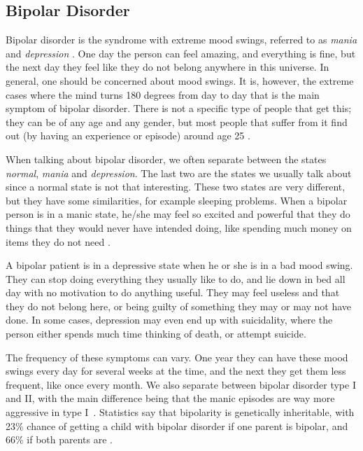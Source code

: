 \subsection{Bipolar Disorder}

Bipolar disorder is the syndrome with extreme mood swings, referred to as \emph{mania} and \emph{depression} \cite{bipolar_disorder}. One day the person can feel amazing, and everything is fine, 
but the next day they feel like they do not belong anywhere in this universe. In general, one should be concerned about mood swings. 
It is, however, the extreme cases where the mind turns 180 degrees from day to day that is the main symptom of bipolar disorder. 
There is not a specific type of people that get this; they can be of any age and any gender, but most people that suffer from it find out 
(by having an experience or episode) around age 25 \cite{bipolar_statistics}. 

When talking about bipolar disorder, we often separate between the states \emph{normal}, \emph{mania} and \emph{depression}. 
The last two are the states we usually talk about since a normal state is not that interesting. These two states are very different, 
but they have some similarities, for example sleeping problems. When a bipolar person is in a manic state, he/she may feel so excited and powerful that they do things that they would never have intended doing, like spending much money on items they do 
not need \cite{bipolar_disorder}.

A bipolar patient is in a depressive state when he or she is in a bad mood swing. They can stop doing everything they usually like to do, 
and lie down in bed all day with no motivation to do anything useful. They may feel useless and that they do not belong here, 
or being guilty of something they may or may not have done. In some cases, depression may even end up with suicidality, 
where the person either spends much time thinking of death, or attempt suicide.

The frequency of these symptoms can vary. One year they can have these mood swings every day for several weeks at the time, and the next they get them less frequent, 
like once every month. We also separate between bipolar disorder type I and II, with the main difference being that the manic episodes are way 
more aggressive in type I \cite{bipolar_types}. Statistics say that bipolarity is genetically inheritable, with 23\% chance of getting a child with bipolar 
disorder if one parent is bipolar, and 66\% if both parents are \cite{bipolar_statistics}. 

